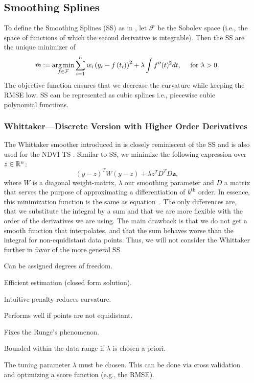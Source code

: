 	\subsection{Smoothing Splines}
		\label{sec:Natural_SS}
		To define the Smoothing Splines (SS) as in \cite{cravenSmoothingNoisyData1978}, let $\mathcal F$ be the Sobolev space (i.e., the space of functions of which the second derivative is integrable). Then the SS are the unique minimizer of
		\begin{equation}
			\label{eq:ss}
			\hat m :=\operatorname*{arg\, min}_{f \in \mathcal F} \sum_{i=1}^{n}w_i\left(y_{i}-{f}\left(t_{i}\right)\right)^{2}+\lambda \int {f}^{\prime \prime}(t)^{2} dt,\quad \text{ for } \lambda >0.
		\end{equation}
		 The objective function ensures that we decrease the curvature while keeping the RMSE low.
		SS can be represented as cubic splines i.e., piecewise cubic polynomial functions.

		\subsubsection{Whittaker---Discrete Version with Higher Order Derivatives}
			The Whittaker smoother introduced in \cite{eilersPerfectSmoother2003} is closely reminiscent of the SS and is also used for the NDVI TS \citep{atzbergerTimeSeriesMonitoring2011}. Similar to SS, we minimize the following expression over $z\in \mathbb{R}^n$:
			$$
			({y}-{z})^{{T}} {W}({y}-{z})+\lambda {z}^{{T}} {D}^{{T}} {D} \mathbf{z},
			$$
			where $W$ is a diagonal weight-matrix, $\lambda$ our smoothing parameter and $D$ a matrix that serves the purpose of approximating a differentiation of $k^\text{th}$ order. In essence, this minimization function is the same as equation~. The only differences are, that we substitute the integral by a sum and that we are more flexible with the order of the derivatives we are using. The main drawback is that we do not get a smooth function that interpolates, and that the sum behaves worse than the integral for non-equidistant data points. Thus, we will not consider the Whittaker further in favor of the more general SS. 

		\begin{my_pros_cons_table}{
				\item Can be assigned degrees of freedom.
				\item Efficient estimation (closed form solution).
				\item Intuitive penalty reduces curvature.
				\item Performs well if points are not equidistant.
				\item Fixes the Runge's phenomenon\footnotemark.
				\item Bounded within the data range if $\lambda$ is chosen a priori.
			}{
				\item The tuning parameter $\lambda$ must be chosen. This can be done via cross validation and optimizing a score function (e.g., the RMSE). 
			}
		\end{my_pros_cons_table}


